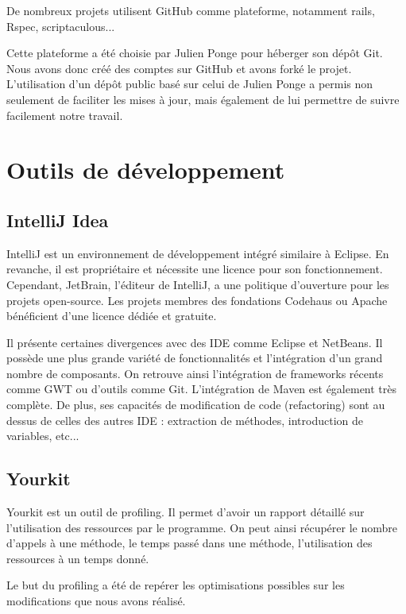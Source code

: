 De nombreux projets utilisent GitHub comme plateforme, notamment rails, Rspec, scriptaculous...

Cette plateforme a été choisie par Julien Ponge pour héberger son dépôt Git.
Nous avons donc créé des comptes sur GitHub et avons forké le projet.
L'utilisation d'un dépôt public basé sur celui de Julien Ponge a permis non seulement de faciliter les mises à jour, mais également de lui permettre de suivre facilement notre travail.

\section{Outils de développement}
\subsection{IntelliJ Idea}
IntelliJ est un environnement de développement intégré similaire à Eclipse.
En revanche, il est propriétaire et nécessite une licence pour son fonctionnement.
Cependant, JetBrain, l'éditeur de IntelliJ, a une politique d'ouverture pour les projets open-source.
Les projets membres des fondations Codehaus ou Apache bénéficient d'une licence dédiée et gratuite.

Il présente certaines divergences avec des IDE comme Eclipse et NetBeans.
Il possède une plus grande variété de fonctionnalités et l'intégration d'un grand nombre de composants.
On retrouve ainsi l'intégration de frameworks récents comme GWT ou d'outils comme Git.
L'intégration de Maven est également très complète.
De plus, ses capacités de modification de code (refactoring) sont au dessus de celles des autres IDE : extraction de méthodes, introduction de variables, etc...

\subsection{Yourkit}
Yourkit est un outil de profiling. Il permet d'avoir un rapport détaillé sur l'utilisation des ressources par le programme. On peut ainsi récupérer le nombre d'appels à une méthode, le temps passé dans une méthode, l'utilisation des ressources à un temps donné.

Le but du profiling a été de repérer les optimisations possibles sur les modifications que nous avons réalisé.